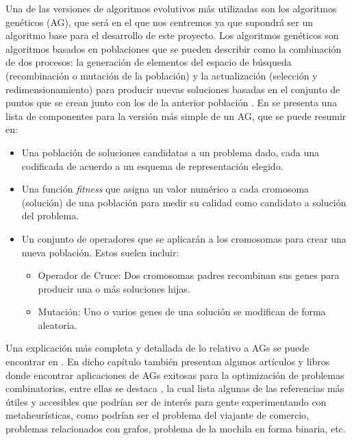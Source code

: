 
Una de las versiones de algoritmos evolutivos más utilizadas son los algoritmos genéticos (AG), que será en el que nos centremos ya que supondrá ser un algoritmo base para el desarrollo de este proyecto. 
Los algoritmos genéticos son algoritmos basados en poblaciones que se pueden describir como la combinación de dos procesos: la generación de elementos del espacio de búsqueda (recombinación o mutación de la población) y la actualización (selección y redimensionamiento) para producir nuevas soluciones basadas en el conjunto de puntos que se crean junto con los de la anterior población \parencite{smithOperatorParameterAdaptation1997} \parencite{tuRobustStochasticGenetic2004}. 
En \parencite{backEvolutionaryComputationOverview1996} se presenta una lista de componentes para la versión más simple de un AG, que se puede resumir en:
\begin{itemize}
	\item Una población de soluciones candidatas a un problema dado, cada una codificada de acuerdo a un esquema de representación elegido. 
	\item Una función \textit{fitness} que asigna un valor numérico a cada cromosoma (solución) de una población para medir su calidad como candidato a solución del problema.
	\item Un conjunto de operadores que se aplicarán a los cromosomas para crear una nueva población. 
Estos suelen incluir:
	\begin{itemize}
		\item Operador de Cruce: Dos cromosomas padres recombinan sus genes para producir una o más soluciones hijas. 
		\item Mutación: Uno o varios genes de una solución se modifican de forma aleatoria. 
	\end{itemize}
\end{itemize}
Una explicación más completa y detallada de lo relativo a AGs se puede encontrar en \parencite{reevesGeneticAlgorithms2010}. 
En dicho capítulo también presentan algunos artículos y libros donde encontrar aplicaciones de AGs exitosas para la optimización de problemas combinatorios, entre ellas se destaca \parencite{reevesFeatureArticleGenetic1997}, la cual lista algunas de las referencias más útiles y accesibles que podrían ser de interés para gente experimentando con metaheurísticas, como podrían ser el problema del viajante de comercio, problemas relacionados con grafos, problema de la mochila en forma binaria, etc. 


